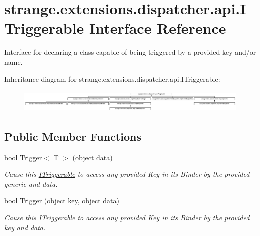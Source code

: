 \hypertarget{interfacestrange_1_1extensions_1_1dispatcher_1_1api_1_1_i_triggerable}{\section{strange.\-extensions.\-dispatcher.\-api.\-I\-Triggerable Interface Reference}
\label{interfacestrange_1_1extensions_1_1dispatcher_1_1api_1_1_i_triggerable}
}


Interface for declaring a class capable of being triggered by a provided key and/or name.  


Inheritance diagram for strange.\-extensions.\-dispatcher.\-api.\-I\-Triggerable\-:\begin{figure}[H]
\begin{center}
\leavevmode
\includegraphics[height=1.106173cm]{interfacestrange_1_1extensions_1_1dispatcher_1_1api_1_1_i_triggerable}
\end{center}
\end{figure}
\subsection*{Public Member Functions}
\begin{DoxyCompactItemize}
\item 
bool \hyperlink{interfacestrange_1_1extensions_1_1dispatcher_1_1api_1_1_i_triggerable_ab51a637635cbd1819f5d33f00831c8d5}{Trigger$<$ T $>$} (object data)
\begin{DoxyCompactList}\small\item\em Cause this \hyperlink{interfacestrange_1_1extensions_1_1dispatcher_1_1api_1_1_i_triggerable}{I\-Triggerable} to access any provided Key in its Binder by the provided generic and data. \end{DoxyCompactList}\item 
bool \hyperlink{interfacestrange_1_1extensions_1_1dispatcher_1_1api_1_1_i_triggerable_a07af18f0259e869bd981b81edb58c28f}{Trigger} (object key, object data)
\begin{DoxyCompactList}\small\item\em Cause this \hyperlink{interfacestrange_1_1extensions_1_1dispatcher_1_1api_1_1_i_triggerable}{I\-Triggerable} to access any provided Key in its Binder by the provided key and data. \end{DoxyCompactList}\end{DoxyCompactItemize}



